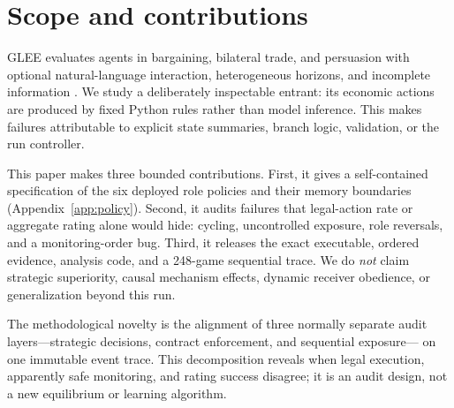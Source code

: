 \section{Scope and contributions}

GLEE evaluates agents in bargaining, bilateral trade, and persuasion with
optional natural-language interaction, heterogeneous horizons, and incomplete
information \citep{shapira2024glee}. We study a deliberately inspectable
entrant: its economic actions are produced by fixed Python rules rather than
model inference. This makes failures attributable to explicit state summaries,
branch logic, validation, or the run controller.

This paper makes three bounded contributions. First, it gives a self-contained
specification of the six deployed role policies and their memory boundaries
(Appendix~\ref{app:policy}). Second, it audits failures that legal-action rate or
aggregate rating alone would hide: cycling, uncontrolled exposure, role
reversals, and a monitoring-order bug. Third, it releases the exact executable,
ordered evidence, analysis code, and a 248-game sequential trace. We do
\emph{not} claim strategic superiority, causal mechanism effects, dynamic
receiver obedience, or generalization beyond this run.

The methodological novelty is the alignment of three normally separate audit
layers---strategic decisions, contract enforcement, and sequential exposure---
on one immutable event trace. This decomposition reveals when legal execution,
apparently safe monitoring, and rating success disagree; it is an audit design,
not a new equilibrium or learning algorithm.
